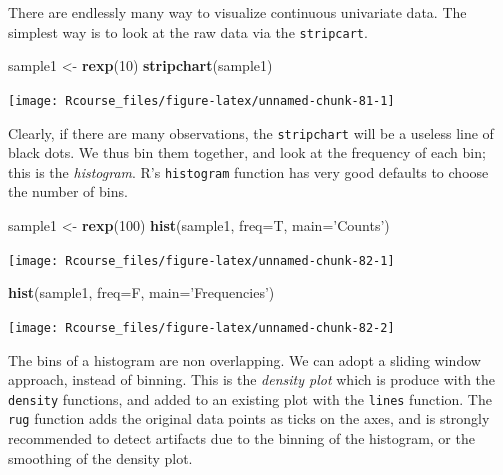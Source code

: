\documentclass[]{book}
\newenvironment{Shaded}{\begin{snugshade}}{\end{snugshade}}
\newcommand{\KeywordTok}[1]{\textcolor[rgb]{0.13,0.29,0.53}{\textbf{{#1}}}}
\newcommand{\DataTypeTok}[1]{\textcolor[rgb]{0.13,0.29,0.53}{{#1}}}
\newcommand{\DecValTok}[1]{\textcolor[rgb]{0.00,0.00,0.81}{{#1}}}
\newcommand{\StringTok}[1]{\textcolor[rgb]{0.31,0.60,0.02}{{#1}}}
\newcommand{\NormalTok}[1]{{#1}}
\theoremstyle{definition}
\theoremstyle{definition}
\theoremstyle{remark}
\begin{document}
There are endlessly many way to visualize continuous univariate data.
The simplest way is to look at the raw data via the \texttt{stripcart}.

\begin{Shaded}
\begin{Highlighting}[]
\NormalTok{sample1 <-}\StringTok{ }\KeywordTok{rexp}\NormalTok{(}\DecValTok{10}\NormalTok{)                             }
\KeywordTok{stripchart}\NormalTok{(sample1)}
\end{Highlighting}
\end{Shaded}

\texttt{[image: Rcourse\_files/figure-latex/unnamed-chunk-81-1]}

Clearly, if there are many observations, the \texttt{stripchart} will be
a useless line of black dots. We thus bin them together, and look at the
frequency of each bin; this is the \emph{histogram}. R's
\texttt{histogram} function has very good defaults to choose the number
of bins.

\begin{Shaded}
\begin{Highlighting}[]
\NormalTok{sample1 <-}\StringTok{ }\KeywordTok{rexp}\NormalTok{(}\DecValTok{100}\NormalTok{)                            }
\KeywordTok{hist}\NormalTok{(sample1, }\DataTypeTok{freq=}\NormalTok{T, }\DataTypeTok{main=}\StringTok{'Counts'}\NormalTok{)        }
\end{Highlighting}
\end{Shaded}

\texttt{[image: Rcourse\_files/figure-latex/unnamed-chunk-82-1]}

\begin{Shaded}
\begin{Highlighting}[]
\KeywordTok{hist}\NormalTok{(sample1, }\DataTypeTok{freq=}\NormalTok{F, }\DataTypeTok{main=}\StringTok{'Frequencies'}\NormalTok{)   }
\end{Highlighting}
\end{Shaded}

\texttt{[image: Rcourse\_files/figure-latex/unnamed-chunk-82-2]}

The bins of a histogram are non overlapping. We can adopt a sliding
window approach, instead of binning. This is the \emph{density plot}
which is produce with the \texttt{density} functions, and added to an
existing plot with the \texttt{lines} function. The \texttt{rug}
function adds the original data points as ticks on the axes, and is
strongly recommended to detect artifacts due to the binning of the
histogram, or the smoothing of the density plot.
\end{document}
